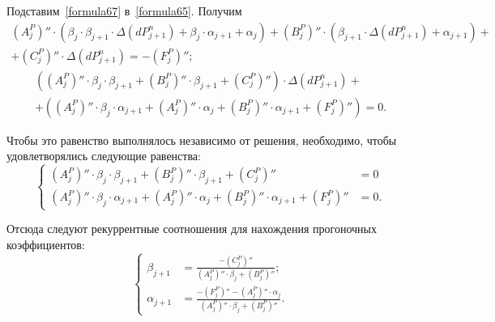 Подставим~\eqref{formula67} в~\eqref{formula65}. Получим
\begin{eqnarray}
\label{formula68}
\left(A_j^P \right)'' \cdot (\beta_j \cdot \beta_{j+1} \cdot \Delta(dP_{j+1}^n) + \beta_j \cdot \alpha_{j+1} + \alpha_j ) + \left(B_j^P \right)'' \cdot (\beta_{j+1} \cdot \Delta(dP_{j+1}^n) + \alpha_{j+1}) + \nonumber ~\\
+ \left(C_j^P \right)'' \cdot \Delta(dP_{j+1}^n) = -\left(F_j^P \right)'';  
\end{eqnarray}
\begin{eqnarray}
\label{formula69}
\left(\left(A_j^P \right)'' \cdot \beta_j \cdot \beta_{j+1} + \left(B_j^P \right)'' \cdot \beta_{j+1} + \left(C_j^P \right)'' \right)\cdot\Delta(dP_{j+1}^n)+ \nonumber ~\\
+\left(\left(A_j^P \right)'' \cdot \beta_j \cdot \alpha_{j+1} + \left(A_j^P \right)'' \cdot \alpha_j + \left(B_j^P \right)'' \cdot \alpha_{j+1} + \left(F_j^P \right)'' \right)=0.  
\end{eqnarray}

Чтобы это равенство выполнялось независимо от решения, необходимо, чтобы удовлетворялись следующие равенства:
\begin{equation}
\label{formula610}
\left\{
\begin{aligned}
\left(A_j^P \right)'' \cdot \beta_j \cdot \beta_{j+1} + \left(B_j^P \right)'' \cdot \beta_{j+1} + \left(C_j^P \right)'' & = 0 \\
\left(A_j^P \right)'' \cdot \beta_j \cdot \alpha_{j+1} + \left(A_j^P \right)'' \cdot \alpha_j + \left(B_j^P \right)'' \cdot \alpha_{j+1} + \left(F_j^P \right)'' & = 0.
\end{aligned}
\right.
\end{equation}

Отсюда следуют рекуррентные соотношения для нахождения прогоночных коэффициентов:
\begin{equation}
\label{formula611}
\left\{
\begin{aligned}
\beta_{j+1} & = \frac{-\left(C_j^P \right)''}{\left(A_j^P \right)'' \cdot \beta_j + \left(B_j^P \right)''}; \\
\alpha_{j+1} & = \frac{-\left(F_j^P \right)''-\left(A_j^P \right)'' \cdot \alpha_j}{\left(A_j^P \right)'' \cdot \beta_j + \left(B_j^P \right)''}.
\end{aligned}
\right.
\end{equation}

